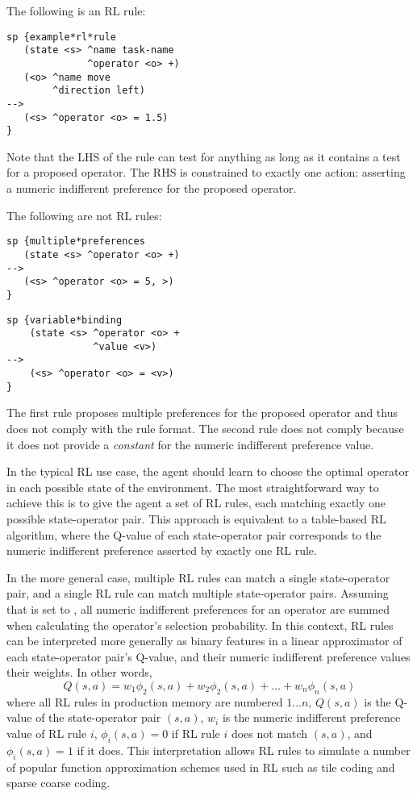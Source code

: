 The following is an RL rule:

\begin{verbatim}
sp {example*rl*rule
   (state <s> ^name task-name
	          ^operator <o> +)
   (<o> ^name move
	    ^direction left)
-->
   (<s> ^operator <o> = 1.5)
}
\end{verbatim}

Note that the LHS of the rule can test for anything as long as it contains a test for a proposed operator.
The RHS is constrained to exactly one action: asserting a numeric indifferent preference for the proposed operator.

The following are not RL rules:

\begin{verbatim}
sp {multiple*preferences
   (state <s> ^operator <o> +)
-->
   (<s> ^operator <o> = 5, >)
}
\end{verbatim}  \vspace{12pt}

\begin{verbatim}
sp {variable*binding
    (state <s> ^operator <o> +
               ^value <v>)
-->
    (<s> ^operator <o> = <v>)
}
\end{verbatim}

The first rule proposes multiple preferences for the proposed operator and thus does not comply with the rule format.
The second rule does not comply because it does not provide a \emph{constant} for the numeric indifferent preference value.

In the typical RL use case, the agent should learn to choose the optimal operator in each possible state of the environment.
The most straightforward way to achieve this is to give the agent a set of RL rules, each matching exactly one possible state-operator pair.
This approach is equivalent to a table-based RL algorithm, where the Q-value of each state-operator pair corresponds to the numeric indifferent preference asserted by exactly one RL rule.

In the more general case, multiple RL rules can match a single state-operator pair, and a single RL rule can match multiple state-operator pairs.
Assuming that  is set to , all numeric indifferent preferences for an operator are summed when calculating the operator's selection probability.
In this context, RL rules can be interpreted more generally as binary features in a linear approximator of each state-operator pair's Q-value, and their numeric indifferent preference values their weights.
In other words,
$$Q(s, a) = w_1 \phi_2 (s, a) + w_2 \phi_2 (s, a) + \ldots + w_n \phi_n (s, a)$$
where all RL rules in production memory are numbered $1 \dots n$, $Q(s, a)$ is the Q-value of the state-operator pair $(s, a)$, $w_i$ is the numeric indifferent preference value of RL rule $i$, $\phi_i (s, a) = 0$ if RL rule $i$ does not match $(s, a)$, and $\phi_i (s, a) = 1$ if it does.
This interpretation allows RL rules to simulate a number of popular function approximation schemes used in RL such as tile coding and sparse coarse coding.

